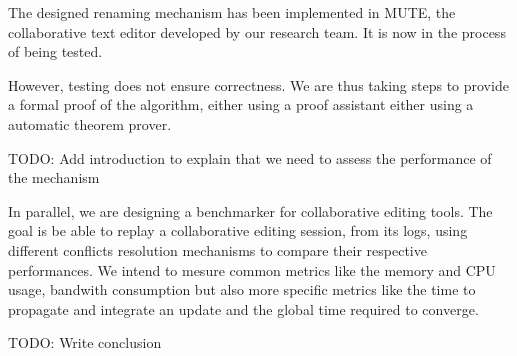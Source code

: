 \documentclass{article}
\begin{document}
The designed renaming mechanism has been implemented in MUTE, the collaborative text editor developed by our research team.
It is now in the process of being tested.

However, testing does not ensure correctness.
We are thus taking steps to provide a formal proof of the algorithm, either using a proof assistant either using a automatic theorem prover.

TODO: Add introduction to explain that we need to assess the performance of the mechanism

In parallel, we are designing a benchmarker for collaborative editing tools.
The goal is be able to replay a collaborative editing session, from its logs, using different conflicts resolution mechanisms to compare their respective performances.
We intend to mesure common metrics like the memory and CPU usage, bandwith consumption but also more specific metrics like the time to propagate and integrate an update and the global time required to converge.


TODO: Write conclusion


\end{document}
